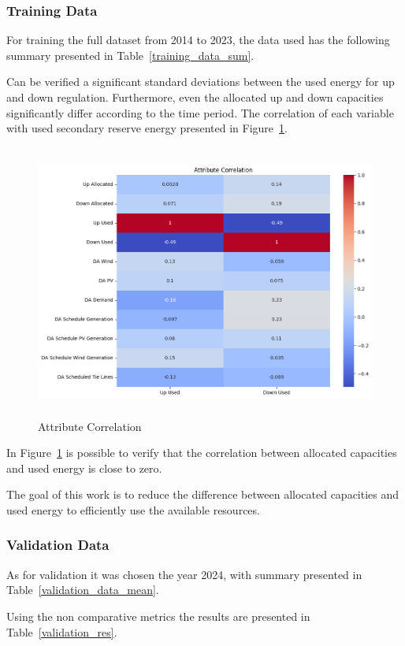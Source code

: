 \subsubsection{Training Data}
For training the full dataset from 2014 to 2023, the data used has the following summary presented in Table~\ref{training_data_sum}.



Can be verified a significant standard deviations between the used energy for up and down regulation. Furthermore, even the allocated up and down capacities significantly differ according to the time period. 
%
The correlation of each variable with used secondary reserve energy presented in Figure~\ref{fig:Attribute_correlation}.

\begin{figure}[H]
    \centering
    \includegraphics[height=9cm, keepaspectratio=true]{plots/correlation_heatmap.png}
    \caption{Attribute Correlation}
    \label{fig:Attribute_correlation}
  \end{figure}
  
 In Figure~\ref{fig:Attribute_correlation} is possible to verify that the correlation between allocated capacities and used energy is close to zero.  
  
The goal of this work is to reduce the difference between allocated capacities and used energy to efficiently use the available resources.

\subsubsection{Validation Data}
As for validation it was chosen the year 2024, with summary presented in Table~\ref{validation_data_mean}.\par

Using the non comparative metrics the results are presented in Table~\ref{validation_res}.

